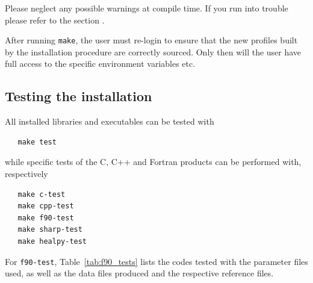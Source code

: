 \documentclass[12pt,twoside]{article}
\begin{document}
Please neglect any possible warnings at compile time. If you run into
trouble please refer to the section .

After running \texttt{make}, the user must re-login to ensure that the new profiles built by the installation
procedure are correctly sourced. Only then will the
user have full access to the specific \healpix
environment variables etc.

\subsection{Testing the installation}

All installed libraries and executables can be tested with 
\begin{verbatim}
   make test
\end{verbatim}

while specific tests of the C, C++ and Fortran products can be performed with,
respectively
\begin{verbatim}
   make c-test
   make cpp-test
   make f90-test
   make sharp-test
   make healpy-test
\end{verbatim}
For \texttt{f90-test}, Table~\ref{tab:f90_tests} lists the codes tested with the
parameter files used, as well as the data files produced and the respective
reference files.
\end{document}
